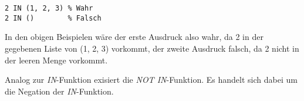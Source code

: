 \begin{lstlisting}
2 IN (1, 2, 3) % Wahr
2 IN ()        % Falsch
\end{lstlisting}
In den obigen Beispielen wäre der erste Ausdruck also wahr, da 2 in der gegebenen Liste von (1, 2, 3) vorkommt, der zweite Ausdruck falsch, da 2 nicht in der leeren Menge vorkommt.

Analog zur \textit{IN}-Funktion exisiert die \textit{NOT IN}-Funktion. Es handelt sich dabei um die Negation der \textit{IN}-Funktion.
